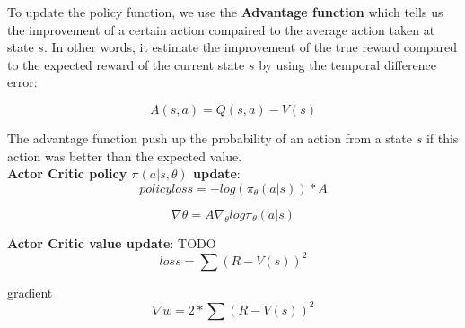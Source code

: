 To update the policy function, we use the \textbf{Advantage function} which tells us the improvement of a certain action compaired to the average action taken at state $s$. 
In other words, it estimate the improvement of the true reward compared to the expected reward of the current state $s$ by using the temporal difference error:

\begin{equation}
	A(s, a) = Q(s, a) - V(s)
\end{equation}

The advantage function push up the probability of an action from a state $s$ if this action was better than the expected value.\\


\textbf{Actor Critic policy $\pi(a | s, \theta)$ update}:
\begin{equation}
	policy loss = - log (\pi_\theta(a | s)) * A
\end{equation}

\begin{equation}
	\nabla \theta = A \nabla_\theta log \pi_\theta (a | s)
\end{equation}
	
\textbf{Actor Critic value update}:
TODO
\begin{equation}
	loss = \sum(R - V(s))^2
\end{equation}

gradient
\begin{equation}
	\nabla w =  2 * \sum(R - V(s))^2
\end{equation}



		

